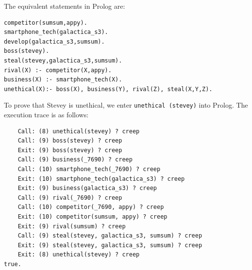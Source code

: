 \documentclass[11pt]{report}
\begin{document}
The equivalent statements in Prolog are:

\begin{lstlisting}
competitor(sumsum,appy).
smartphone_tech(galactica_s3).
develop(galactica_s3,sumsum).
boss(stevey).
steal(stevey,galactica_s3,sumsum).
rival(X) :- competitor(X,appy).
business(X) :- smartphone_tech(X).
unethical(X):- boss(X), business(Y), rival(Z), steal(X,Y,Z).
\end{lstlisting}

To prove that Stevey is unethical, we enter \texttt{unethical\,(stevey)} into
Prolog. The execution trace is as follows:

\begin{lstlisting}
    Call: (8) unethical(stevey) ? creep
    Call: (9) boss(stevey) ? creep
    Exit: (9) boss(stevey) ? creep
    Call: (9) business(_7690) ? creep
    Call: (10) smartphone_tech(_7690) ? creep
    Exit: (10) smartphone_tech(galactica_s3) ? creep
    Exit: (9) business(galactica_s3) ? creep
    Call: (9) rival(_7690) ? creep
    Call: (10) competitor(_7690, appy) ? creep
    Exit: (10) competitor(sumsum, appy) ? creep
    Exit: (9) rival(sumsum) ? creep
    Call: (9) steal(stevey, galactica_s3, sumsum) ? creep
    Exit: (9) steal(stevey, galactica_s3, sumsum) ? creep
    Exit: (8) unethical(stevey) ? creep
true.
\end{lstlisting}
\end{document}
